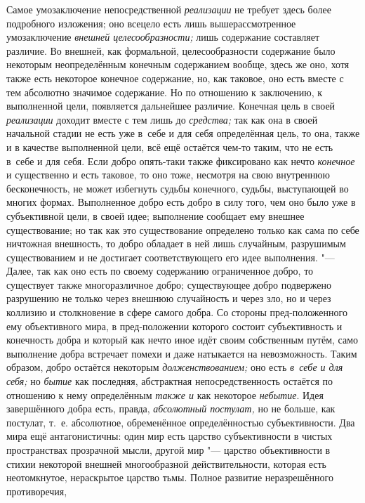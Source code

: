 Самое умозаключение непосредственной
{\em реализации} не
требует здесь более подробного изложения; оно всецело есть лишь
вышерассмотренное умозаключение
{\em внешней целесообразности;}
лишь содержание составляет различие. Во внешней, как
формальной, целесообразности содержание было некоторым неопределённым
конечным содержанием вообще, здесь же оно, хотя также есть некоторое
конечное содержание, но, как таковое, оно есть вместе с тем абсолютно
значимое содержание. Но по отношению к заключению, к выполненной цели,
появляется дальнейшее различие. Конечная цель в своей
{\em реализации} доходит
вместе с тем лишь до {\em средства;}
так как она в своей начальной стадии не есть уже в~себе и для
себя определённая цель, то она, также и в качестве выполненной цели, всё
ещё остаётся чем-то таким, что не есть в~себе и для себя. Если добро
опять-таки также фиксировано как нечто
{\em конечное} и
существенно и есть таковое, то оно тоже, несмотря на свою внутреннюю
бесконечность, не может избегнуть судьбы конечного, судьбы, выступающей во
многих формах. Выполненное добро есть добро в силу того, чем оно было уже в
субъективной цели, в своей идее; выполнение сообщает ему внешнее
существование; но так как это существование определено только как сама по
себе ничтожная внешность, то добро обладает в ней лишь случайным,
разрушимым существованием и не достигает соответствующего его идее
выполнения. "--- Далее, так как оно есть по своему содержанию
ограниченное добро, то существует также многоразличное добро; существующее
добро подвержено разрушению не только через внешнюю случайность и через
зло, но и через коллизию и столкновение в сфере самого добра. Со стороны
пред-положенного ему объективного мира, в пред-положении которого состоит
субъективность и конечность добра и который как нечто иное идёт своим
собственным путём, само выполнение добра встречает помехи и даже натыкается
на невозможность. Таким образом, добро остаётся некоторым
{\em долженствованием;}
оно есть {\em в~себе и для
себя;} но {\em бытие}
как последняя, абстрактная непосредственность остаётся по
отношению к нему определённым {\em также
и} как некоторое
{\em небытие}. Идея
завершённого добра есть, правда,
{\em абсолютный постулат,}
но не больше, как постулат, т.~е. абсолютное, обременённое
определённостью субъективности. Два мира ещё антагонистичны: один мир есть
царство субъективности в чистых пространствах прозрачной мысли, другой мир
"--- царство объективности в стихии некоторой внешней
многообразной действительности, которая есть неотомкнутое, нераскрытое
царство тьмы. Полное развитие неразрешённого противоречия,

